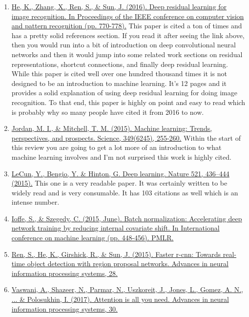 \documentclass{article}
\begin{document}
\begin{enumerate}
\item \href{https://arxiv.org/abs/1512.03385?context=cs }{He, K., Zhang, X., Ren, S., \& Sun, J. (2016). Deep residual learning for image recognition. In Proceedings of the IEEE conference on computer vision and pattern recognition (pp. 770-778).} This paper is cited a ton of times and has a pretty solid references section. If you read it after seeing the link above, then you would run into a bit of introduction on deep convolutional neural networks and then it would jump into some related work sections on residual representations, shortcut connections, and finally deep residual learning. While this paper is cited well over one hundred thousand times it is not designed to be an introduction to machine learning. It’s 12 pages and it provides a solid explanation of using deep residual learning for doing image recognition. To that end, this paper is highly on point and easy to read which is probably why so many people have cited it from 2016 to now. \cite{he2016deep}
\item  \href{https://www.science.org/doi/abs/10.1126/science.aaa8415}{Jordan, M. I., \& Mitchell, T. M. (2015). Machine learning: Trends, perspectives, and prospects. Science, 349(6245), 255-260.} Within the start of this review you are going to get a lot more of an introduction to what machine learning involves and I’m not surprised this work is highly cited. \cite{jordan2015machine}
\item  \href{https://doi.org/10.1038/nature14539 }{LeCun, Y., Bengio, Y. \& Hinton, G. Deep learning. Nature 521, 436–444 (2015).} This one is a very readable paper. It was certainly written to be widely read and is very consumable. It has 103 citations as well which is an intense number. \cite{lecun2015deep}
\item \href{https://arxiv.org/pdf/1502.03167.pdf }{Ioffe, S., \& Szegedy, C. (2015, June). Batch normalization: Accelerating deep network training by reducing internal covariate shift. In International conference on machine learning (pp. 448-456). PMLR.} \cite{ioffe2015batch}
\item \href{https://proceedings.neurips.cc/paper/2015/file/14bfa6bb14875e45bba028a21ed38046-Paper.pdf }{Ren, S., He, K., Girshick, R., \& Sun, J. (2015). Faster r-cnn: Towards real-time object detection with region  proposal networks. Advances in neural information processing systems, 28.} \cite{ren2015faster}
\item  \href{https://proceedings.neurips.cc/paper/2017/file/3f5ee243547dee91fbd053c1c4a845aa-Paper.pdf}{Vaswani, A., Shazeer, N., Parmar, N., Uszkoreit, J., Jones, L., Gomez, A. N., ... \& Polosukhin, I. (2017). Attention is all you need. Advances in neural information processing systems, 30.} \cite{vaswani2017attention}

\end{enumerate}
\end{document}
